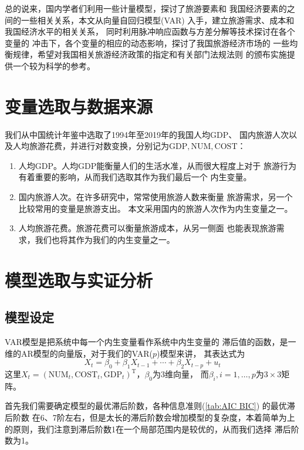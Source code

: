 \documentclass{article}
\def\NUM{\mathrm{NUM}}
\def\COST{\mathrm{COST}}
\def\GDP{\mathrm{GDP}}
\begin{document}
    总的说来，国内学者们利用一些计量模型，探讨了旅游要素和
    我国经济要素的之间的一些相关关系，本文从向量自回归模型(VAR)
    入手，建立旅游需求、成本和我国经济水平的相关关系，
    同时利用脉冲响应函数与方差分解等技术探讨在各个变量的
    冲击下，各个变量的相应的动态影响，探讨了我国旅游经济市场的
    一些均衡规律，希望对我国相关旅游经济政策的指定和有关部门法规法则
    的颁布实施提供一个较为科学的参考。

    \section{变量选取与数据来源}
    我们从中国统计年鉴\cite{中华2014中}中选取了1994年至2019年的我国人均GDP、
    国内旅游人次以及人均旅游花费，并进行对数变换，分别记为$\GDP,\NUM,\COST$：
    \begin{enumerate}
        \item 人均GDP。人均GDP能衡量人们的生活水准，从而很大程度上对于
        旅游行为有着重要的影响，从而我们选取其作为我们最后一个
        内生变量。

        \item 国内旅游人次。在许多研究中，常常使用旅游人数来衡量
        旅游需求，另一个比较常用的变量是旅游支出\cite{witt1995forecasting}。
        本文采用国内的旅游人次作为内生变量之一。

        \item 人均旅游花费。旅游花费可以衡量旅游成本，从另一侧面
        也能表现旅游需求，我们也将其作为我们的内生变量之一。
    \end{enumerate}

    \section{模型选取与实证分析}
    \subsection{模型设定}
    VAR模型是把系统中每一个内生变量看作系统中内生变量的
    滞后值的函数，是一维的AR模型的向量版，对于我们的VAR($p$)模型来讲，
    其表达式为
    \[X_t=\beta_0+\beta_1X_{t-1}+\cdots+\beta_2X_{t-p}+u_t\]
    这里$X_t=(\NUM_t,\COST_t,\GDP_t)^\mathrm T$，$\beta_0$为3维向量，
    而$\beta_i,i=1,\ldots,p$为$3\times 3$矩阵。

    首先我们需要确定模型的最优滞后阶数，各种信息准则(\cref{tab:AIC BIC})
    的最优滞后阶数
    在6、7阶左右，但是太长的滞后阶数会增加模型的复杂度，本着简单为上
    的原则，我们注意到滞后阶数1在一个局部范围内是较优的，从而我们选择
    滞后阶数为1。
\end{document}
